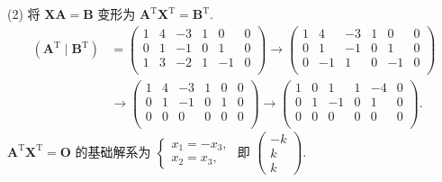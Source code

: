 \documentclass[../../main.tex]{subfiles}
\begin{document}
\begin{solution}
(2) 将 $\boldsymbol{XA} = \boldsymbol{B}$ 变形为 $\boldsymbol{A}^\mathrm{T}\boldsymbol{X}^\mathrm{T} = \boldsymbol{B}^\mathrm{T}$.
\begin{align*}
\left( \boldsymbol{A}^{\mathrm{T}}\mid \boldsymbol{B}^{\mathrm{T}} \right) &=\left( \begin{matrix}
1&		4&		-3&		1&		0&		0\\
0&		1&		-1&		0&		1&		0\\
1&		3&		-2&		1&		-1&		0\\
\end{matrix} \right) \rightarrow \left( \begin{matrix}
1&		4&		-3&		1&		0&		0\\
0&		1&		-1&		0&		1&		0\\
0&		-1&		1&		0&		-1&		0\\
\end{matrix} \right) 
\\
&\rightarrow \left( \begin{matrix}
1&		4&		-3&		1&		0&		0\\
0&		1&		-1&		0&		1&		0\\
0&		0&		0&		0&		0&		0\\
\end{matrix} \right) \rightarrow \left( \begin{matrix}
1&		0&		1&		1&		-4&		0\\
0&		1&		-1&		0&		1&		0\\
0&		0&		0&		0&		0&		0\\
\end{matrix} \right) .
\end{align*}
$\boldsymbol{A}^\mathrm{T}\boldsymbol{X}^\mathrm{T} = \boldsymbol{O}$ 的基础解系为 $\begin{cases} x_1 = -x_3, \\ x_2 = x_3, \end{cases}$ 即 $\begin{pmatrix} -k \\ k \\ k \end{pmatrix}$.


\end{solution}
\end{document}
